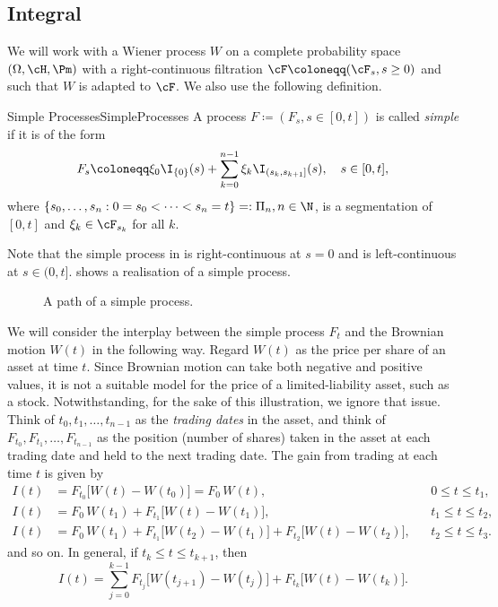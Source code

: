 \subsection{\Ito{} Integral}
We will work with a Wiener process \(W\) on a complete probability space \((\Omega, \cH, \Pm)\) with a right-continuous filtration \(\cF \coloneqq (\cF_s, s \ge 0)\) and such that \(W\) is adapted to \(\cF\). We also use the following definition.

\begin{defn}{Simple Processes}{SimpleProcesses}
	A process \(F \coloneqq (F_s, s \in [0, t])\) is called \emph{simple} if it is of the form
	\begin{equation}\label{eq:SimpleProcessDef}
		F_s \coloneqq \xi_0 \I_{\{0\}}(s) + \sum_{k=0}^{n-1} \xi_k \I_{(s_k, s_{k+1}]}(s), \quad s \in [0, t],
	\end{equation}
	where \(\{s_0, \dots, s_n : 0 = s_0 < \dots < s_n = t\} =: \Pi_n, n \in \N\), is a segmentation of \([0, t]\) and \(\xi_k \in \cF_{s_k}\) for all \(k\).
\end{defn}

Note that the simple process in  is right-continuous at \(s = 0\) and is left-continuous at \(s \in (0, t]\).  shows a realisation of a simple process.

\begin{figure}[H]
	\centering
	
	\caption{A path of a simple process.}
	\label{fig:SimpleProcessPath}
\end{figure}

We will consider the interplay between the simple process \(F_t\) and the Brownian motion \(W(t)\) in the following way. Regard \(W(t)\) as the price per share of an asset at time \(t\). Since Brownian motion can take both negative and positive values, it is not a suitable model for the price of a limited-liability asset, such as a stock. Notwithstanding, for the sake of this illustration, we ignore that issue. Think of \(t_0, t_1, \dots, t_{n-1}\) as the \textit{trading dates} in the asset, and think of \(F_{t_0}, F_{t_1}, \dots, F_{t_{n-1}}\) as the position (number of shares) taken in the asset at each trading date and held to the next trading date. The gain from trading at each time \(t\) is given by
\begin{align}
	I(t) & = F_{t_0}\big[W(t) - W(t_0)\big] = F_0\,W(t),                                      &  & 0 \le t \le t_1,   \\
	I(t) & = F_0\,W(t_1) + F_{t_1}\big[W(t) - W(t_1)\big],                                    &  & t_1 \le t \le t_2, \\
	I(t) & = F_0\,W(t_1) + F_{t_1}\big[W(t_2) - W(t_1)\big] + F_{t_2}\big[W(t) - W(t_2)\big], &  & t_2 \le t \le t_3.
\end{align}
and so on. In general, if \(t_k \le t \le t_{k+1}\), then
\begin{equation}\label{eq:TradingGain}
	I(t) = \sum_{j=0}^{k-1} F_{t_j}\big[W(t_{j+1}) - W(t_j)\big] + F_{t_k}\big[W(t) - W(t_k)\big].
\end{equation}

